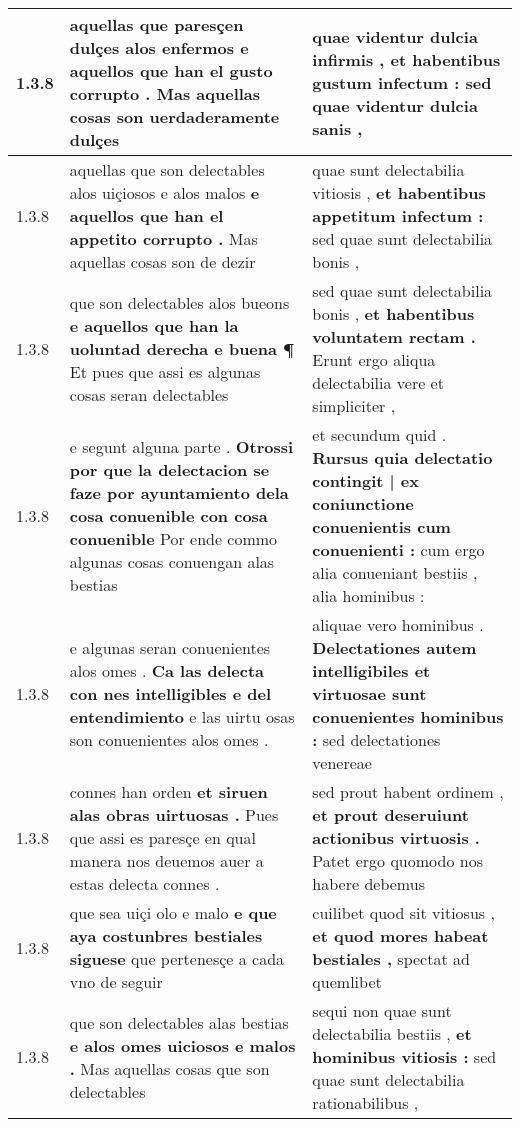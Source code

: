\begin{tabular}{|p{1cm}|p{6.5cm}|p{6.5cm}|}
1.3.8 & aquellas que paresçen dulçes alos enfermos \textbf{ e aquellos que han el gusto corrupto . } Mas aquellas cosas son uerdaderamente dulçes & quae videntur dulcia infirmis , \textbf{ et habentibus gustum infectum : } sed quae videntur dulcia sanis , \\\hline
1.3.8 & aquellas que son delectables alos uiçiosos e alos malos \textbf{ e aquellos que han el appetito corrupto . } Mas aquellas cosas son de dezir & quae sunt delectabilia vitiosis , \textbf{ et habentibus appetitum infectum : } sed quae sunt delectabilia bonis , \\\hline
1.3.8 & que son delectables alos bueons \textbf{ e aquellos que han la uoluntad derecha e buena ¶ } Et pues que assi es algunas cosas seran delectables & sed quae sunt delectabilia bonis , \textbf{ et habentibus voluntatem rectam . } Erunt ergo aliqua delectabilia vere et simpliciter , \\\hline
1.3.8 & e segunt alguna parte . \textbf{ Otrossi por que la delectacion se faze por ayuntamiento dela cosa conuenible con cosa conuenible } Por ende commo algunas cosas conuengan alas bestias & et secundum quid . \textbf{ Rursus quia delectatio contingit | ex coniunctione conuenientis cum conuenienti : } cum ergo alia conueniant bestiis , alia hominibus : \\\hline
1.3.8 & e algunas seran conuenientes alos omes . \textbf{ Ca las delecta con nes intelligibles e del entendimiento } e las uirtu osas son conuenientes alos omes . & aliquae vero hominibus . \textbf{ Delectationes autem intelligibiles et virtuosae sunt conuenientes hominibus : } sed delectationes venereae \\\hline
1.3.8 & connes han orden \textbf{ et siruen alas obras uirtuosas . } Pues que assi es paresçe en qual manera nos deuemos auer a estas delecta connes . & sed prout habent ordinem , \textbf{ et prout deseruiunt actionibus virtuosis . } Patet ergo quomodo nos habere debemus \\\hline
1.3.8 & que sea uiçi olo e malo \textbf{ e que aya costunbres bestiales siguese } que pertenesçe a cada vno de seguir & cuilibet quod sit vitiosus , \textbf{ et quod mores habeat bestiales , } spectat ad quemlibet \\\hline
1.3.8 & que son delectables alas bestias \textbf{ e alos omes uiciosos e malos . } Mas aquellas cosas que son delectables & sequi non quae sunt delectabilia bestiis , \textbf{ et hominibus vitiosis : } sed quae sunt delectabilia rationabilibus , \\\hline

\end{tabular}
